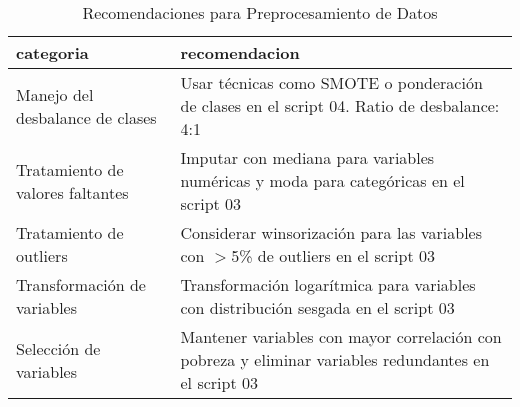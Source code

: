 \begin{table}[ht]
\centering
\begin{tabular}{ll}
  \toprule
categoria & recomendacion \\ 
  \midrule
Manejo del desbalance de clases & Usar técnicas como SMOTE o ponderación de clases en el script 04. Ratio de desbalance: 4:1 \\ 
  Tratamiento de valores faltantes & Imputar con mediana para variables numéricas y moda para categóricas en el script 03 \\ 
  Tratamiento de outliers & Considerar winsorización para las variables con $>$5\% de outliers en el script 03 \\ 
  Transformación de variables & Transformación logarítmica para variables con distribución sesgada en el script 03 \\ 
  Selección de variables & Mantener variables con mayor correlación con pobreza y eliminar variables redundantes en el script 03 \\ 
   \bottomrule
\end{tabular}
\caption{Recomendaciones para Preprocesamiento de Datos} 
\label{tab:recomendaciones}
\end{table}
